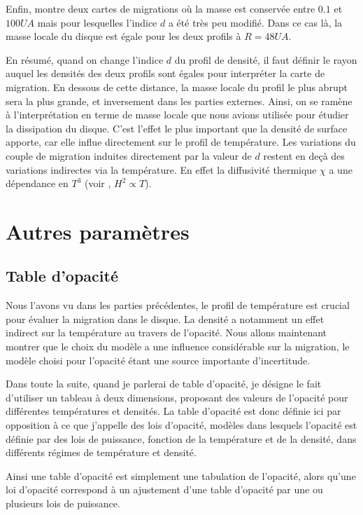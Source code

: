 Enfin,  montre deux cartes de migrations où la masse est conservée entre $0.1$ et $100\unit{UA}$ mais pour lesquelles l'indice $d$ a été très peu modifié. Dans ce cas là, la masse locale du disque est égale pour les deux profils à $R=48\unit{UA}$. 

\bigskip

En résumé, quand on change l'indice $d$ du profil de densité, il faut définir le rayon auquel les densités des deux profils sont égales pour interpréter la carte de migration. En dessous de cette distance, la masse locale du profil le plus abrupt sera la plus grande, et inversement dans les parties externes. Ainsi, on se ramène à l'interprétation en terme de masse locale que nous avions utilisée pour étudier la dissipation du disque. C'est l'effet le plus important que la densité de surface apporte, car elle influe directement sur le profil de température. Les variations du couple de migration induites directement par la valeur de $d$ restent en deçà des variations indirectes via la température. En effet la diffusivité thermique $\chi$ a une dépendance en $T^3$ (voir , $H^2\propto T$).

\section{Autres paramètres}
\subsection{Table d'opacité}\label{sec:influence_opacity_table}
Nous l'avons vu dans les parties précédentes, le profil de température est crucial pour évaluer la migration dans le disque. La densité a notamment un effet indirect sur la température au travers de l'opacité. Nous allons maintenant montrer que le choix du modèle a une influence considérable sur la migration, le modèle choisi pour l'opacité étant une source importante d'incertitude.

Dans toute la suite, quand je parlerai de table d'opacité, je désigne le fait d'utiliser un tableau à deux dimensions,
proposant des valeurs de l'opacité pour différentes températures et densités. La table d'opacité est donc définie ici par
opposition à ce que j'appelle des lois d'opacité, modèles dans lesquels l'opacité est définie par des lois de puissance,
fonction de la température et de la densité, dans différents régimes de température et densité.

Ainsi une table d'opacité est simplement une tabulation de l'opacité, alors qu'une loi d'opacité correspond à un ajustement d'une table d'opacité par
une ou plusieurs lois de puissance. 

